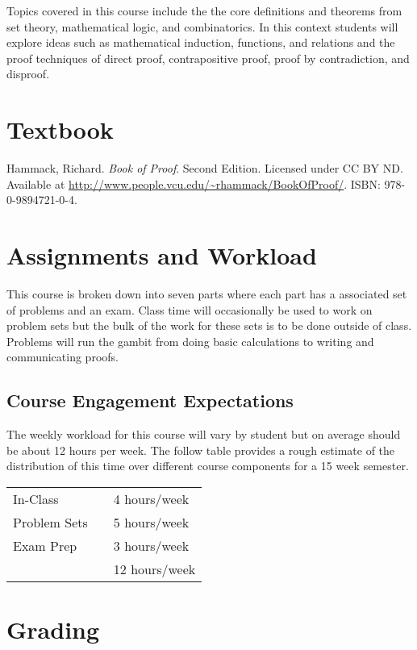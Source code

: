 \documentclass[nobib]{tufte-handout}
\begin{document}
Topics covered in this course include the the core definitions and theorems from set theory, mathematical logic, and combinatorics.  In this context students will explore ideas such as mathematical induction, functions, and relations and the proof techniques of direct proof, contrapositive proof, proof by contradiction, and disproof.


\section{Textbook}

\noindent
Hammack, Richard\@. \textit{Book of Proof}. Second Edition. Licensed under CC BY ND. Available at \url{http://www.people.vcu.edu/~rhammack/BookOfProof/}. ISBN: 978-0-9894721-0-4. %

\section{Assignments and Workload}

This course is broken down into seven parts where each part has a associated set of problems and an exam. Class time will occasionally be used to work on problem sets but the bulk of the work for these sets is to be done outside of class.  Problems will run the gambit from doing basic calculations to writing and communicating proofs.

\subsection{Course Engagement Expectations}

The weekly workload for this course will vary by student but on average should be about 12 hours per week.  The follow table provides a rough estimate of the distribution of this time over different course components for a 15 week semester.
\begin{center}
\begin{tabular}{lll}
In-Class &      & 4 hours/week \\
Problem Sets &  & 5 hours/week \\
Exam Prep &   & 3 hours/week \\
& & 12 hours/week \\
\end{tabular}
\end{center}


\section{Grading}
\end{document}
